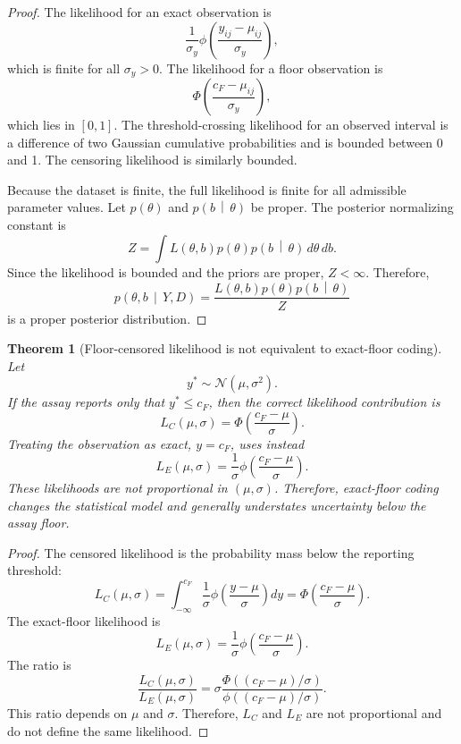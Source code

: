 \documentclass[11pt]{article}
\newtheorem{theorem}{Theorem}
\theoremstyle{remark}
\newcommand{\Normal}{\mathcal{N}}
\newcommand{\given}{\,\middle|\,}
\newcommand{\PhiStd}{\Phi}
\newcommand{\phiStd}{\phi}
\begin{document}
\begin{proof}
The likelihood for an exact observation is
\[
\frac{1}{\sigma_y}
\phiStd
\left(
\frac{y_{ij}-\mu_{ij}}{\sigma_y}
\right),
\]
which is finite for all \(\sigma_y>0\). The likelihood for a floor observation is
\[
\PhiStd
\left(
\frac{c_F-\mu_{ij}}{\sigma_y}
\right),
\]
which lies in \([0,1]\). The threshold-crossing likelihood for an observed interval is a difference of two Gaussian cumulative probabilities and is bounded between 0 and 1. The censoring likelihood is similarly bounded.

Because the dataset is finite, the full likelihood is finite for all admissible parameter values. Let \(p(\theta)\) and \(p(b\given\theta)\) be proper. The posterior normalizing constant is
\[
Z
=
\int
L(\theta,b)p(\theta)p(b\given\theta)
\,d\theta\,db.
\]
Since the likelihood is bounded and the priors are proper, \(Z<\infty\). Therefore,
\[
p(\theta,b\given Y,D)
=
\frac{L(\theta,b)p(\theta)p(b\given\theta)}{Z}
\]
is a proper posterior distribution.
\end{proof}

\begin{theorem}[Floor-censored likelihood is not equivalent to exact-floor coding]
Let
\[
y^*\sim \Normal(\mu,\sigma^2).
\]
If the assay reports only that \(y^*\leq c_F\), then the correct likelihood contribution is
\[
L_C(\mu,\sigma)
=
\PhiStd
\left(
\frac{c_F-\mu}{\sigma}
\right).
\]
Treating the observation as exact, \(y=c_F\), uses instead
\[
L_E(\mu,\sigma)
=
\frac{1}{\sigma}
\phiStd
\left(
\frac{c_F-\mu}{\sigma}
\right).
\]
These likelihoods are not proportional in \((\mu,\sigma)\). Therefore, exact-floor coding changes the statistical model and generally understates uncertainty below the assay floor.
\end{theorem}

\begin{proof}
The censored likelihood is the probability mass below the reporting threshold:
\[
L_C(\mu,\sigma)
=
\int_{-\infty}^{c_F}
\frac{1}{\sigma}
\phiStd
\left(
\frac{y-\mu}{\sigma}
\right)
dy
=
\PhiStd
\left(
\frac{c_F-\mu}{\sigma}
\right).
\]
The exact-floor likelihood is
\[
L_E(\mu,\sigma)
=
\frac{1}{\sigma}
\phiStd
\left(
\frac{c_F-\mu}{\sigma}
\right).
\]
The ratio is
\[
\frac{L_C(\mu,\sigma)}{L_E(\mu,\sigma)}
=
\sigma
\frac{
\PhiStd\left((c_F-\mu)/\sigma\right)
}{
\phiStd\left((c_F-\mu)/\sigma\right)
}.
\]
This ratio depends on \(\mu\) and \(\sigma\). Therefore, \(L_C\) and \(L_E\) are not proportional and do not define the same likelihood.
\end{proof}
\end{document}
